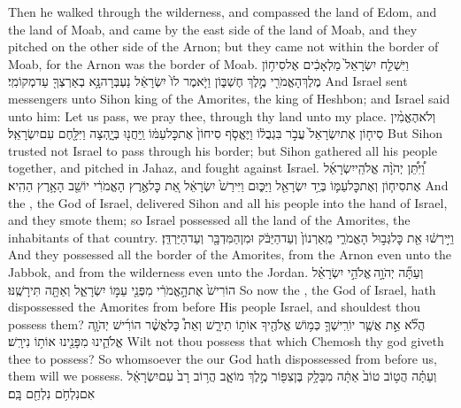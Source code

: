 {Then he walked through the wilderness, and compassed the land of Edom, and the land of Moab, and came by the east side of the land of Moab, and they pitched on the other side of the Arnon; but they came not within the border of Moab, for the Arnon was the border of Moab.}
{וַיִּשְׁלַ֤ח יִשְׂרָאֵל֙ מַלְאָכִ֔ים אֶל\maqqaf סִיח֥וֹן מֶלֶךְ\maqqaf הָאֱמֹרִ֖י מֶ֣לֶךְ חֶשְׁבּ֑וֹן וַיֹּ֤אמֶר לוֹ֙ יִשְׂרָאֵ֔ל נַעְבְּרָה\maqqaf נָּ֥א בְאַרְצְךָ֖ עַד\maqqaf מְקוֹמִֽי׃}
{And Israel sent messengers unto Sihon king of the Amorites, the king of Heshbon; and Israel said unto him: Let us pass, we pray thee, through thy land unto my place.}
{וְלֹא\maqqaf הֶאֱמִ֨ין סִיח֤וֹן אֶת\maqqaf יִשְׂרָאֵל֙ עֲבֹ֣ר בִּגְבֻל֔וֹ וַיֶּאֱסֹ֤ף סִיחוֹן֙ אֶת\maqqaf כׇּל\maqqaf עַמּ֔וֹ וַֽיַּחֲנ֖וּ בְּיָ֑הְצָה וַיִּלָּ֖חֶם עִם\maqqaf יִשְׂרָאֵֽל׃}
{But Sihon trusted not Israel to pass through his border; but Sihon gathered all his people together, and pitched in Jahaz, and fought against Israel.}
{וַ֠יִּתֵּ֠ן יְהֹוָ֨ה אֱלֹהֵֽי\maqqaf יִשְׂרָאֵ֜ל אֶת\maqqaf סִיח֧וֹן וְאֶת\maqqaf כׇּל\maqqaf עַמּ֛וֹ בְּיַ֥ד יִשְׂרָאֵ֖ל וַיַּכּ֑וּם וַיִּירַשׁ֙ יִשְׂרָאֵ֔ל אֵ֚ת כׇּל\maqqaf אֶ֣רֶץ הָאֱמֹרִ֔י יוֹשֵׁ֖ב הָאָ֥רֶץ הַהִֽיא׃}
{And the \lord, the God of Israel, delivered Sihon and all his people into the hand of Israel, and they smote them; so Israel possessed all the land of the Amorites, the inhabitants of that country.}
{וַיִּ֣ירְשׁ֔וּ אֵ֖ת כׇּל\maqqaf גְּב֣וּל הָאֱמֹרִ֑י מֵֽאַרְנוֹן֙ וְעַד\maqqaf הַיַּבֹּ֔ק וּמִן\maqqaf הַמִּדְבָּ֖ר וְעַד\maqqaf הַיַּרְדֵּֽן׃}
{And they possessed all the border of the Amorites, from the Arnon even unto the Jabbok, and from the wilderness even unto the Jordan.}
{וְעַתָּ֞ה יְהֹוָ֣ה \legarmeh  אֱלֹהֵ֣י יִשְׂרָאֵ֗ל הוֹרִישׁ֙ אֶת\maqqaf הָ֣אֱמֹרִ֔י מִפְּנֵ֖י עַמּ֣וֹ יִשְׂרָאֵ֑ל וְאַתָּ֖ה תִּירָשֶֽׁנּוּ׃}
{So now the \lord, the God of Israel, hath dispossessed the Amorites from before His people Israel, and shouldest thou possess them?}
{הֲלֹ֞א אֵ֣ת אֲשֶׁ֧ר יוֹרִֽישְׁךָ֛ כְּמ֥וֹשׁ אֱלֹהֶ֖יךָ אוֹת֣וֹ תִירָ֑שׁ וְאֵת֩ כׇּל\maqqaf אֲשֶׁ֨ר הוֹרִ֜ישׁ יְהֹוָ֧ה אֱלֹהֵ֛ינוּ מִפָּנֵ֖ינוּ אוֹת֥וֹ נִירָֽשׁ׃}
{Wilt not thou possess that which Chemosh thy god giveth thee to possess? So whomsoever the \lord\space our God hath dispossessed from before us, them will we possess.}
{וְעַתָּ֗ה הֲט֥וֹב טוֹב֙ אַתָּ֔ה מִבָּלָ֥ק בֶּן\maqqaf צִפּ֖וֹר מֶ֣לֶךְ מוֹאָ֑ב הֲר֥וֹב רָב֙ עִם\maqqaf יִשְׂרָאֵ֔ל אִם\maqqaf נִלְחֹ֥ם נִלְחַ֖ם בָּֽם׃}
